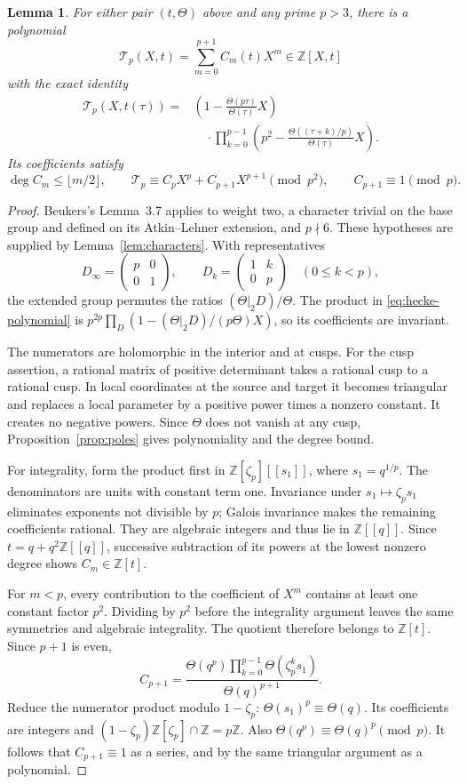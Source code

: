 \documentclass[11pt,a4paper]{article}
\newtheorem{lemma}[theorem]{Lemma}
\theoremstyle{remark}
\newcommand{\Z}{\mathbb Z}
\newcommand{\smat}[4]{\begin{pmatrix}#1&#2\\#3&#4\end{pmatrix}}
\begin{document}
\begin{lemma}\label{lem:hecke}
For either pair $(t,\Theta)$ above and any prime $p>3$, there is a
polynomial
\[
 \mathscr T_p(X,t)=\sum_{m=0}^{p+1}C_m(t)X^m\in\Z[X,t]
\]
with the exact identity
\begin{equation}\label{eq:hecke-polynomial}
\begin{split}
 \mathscr T_p(X,t(\tau))={}&
 \left(1-\frac{\Theta(p\tau)}{\Theta(\tau)}X\right)\\
 &\quad\cdot\prod_{k=0}^{p-1}
 \left(p^2-\frac{\Theta((\tau+k)/p)}{\Theta(\tau)}X\right).
\end{split}
\end{equation}
Its coefficients satisfy
\begin{equation}\label{eq:hecke-properties}
 \deg C_m\le\lfloor m/2\rfloor,\qquad
 \mathscr T_p\equiv C_pX^p+C_{p+1}X^{p+1}\pmod{p^2},
 \qquad C_{p+1}\equiv1\pmod p.
\end{equation}
\end{lemma}
\begin{proof}
Beukers's Lemma~3.7 \cite[pp.~17--18]{beukers} applies to weight two,
a character trivial on the base group and defined on its
Atkin--Lehner extension, and $p\nmid6$. These hypotheses are supplied
by Lemma~\ref{lem:characters}. With representatives
\[
 D_\infty=\smat{p}{0}{0}{1},\qquad
 D_k=\smat{1}{k}{0}{p}\quad(0\le k<p),
\]
the extended group permutes the ratios $(\Theta|_2D)/\Theta$.
The product in \eqref{eq:hecke-polynomial} is
$p^{2p}\prod_D(1-(\Theta|_2D)/(p\Theta)X)$, so its coefficients
are invariant.

The numerators are holomorphic in the interior and at cusps. For the
cusp assertion, a rational matrix of positive determinant takes a
rational cusp to a rational cusp. In local coordinates at the source
and target it becomes triangular and replaces a local parameter by
a positive power times a nonzero constant. It creates no negative
powers. Since $\Theta$ does not vanish at any cusp,
Proposition~\ref{prop:poles} gives polynomiality and the degree bound.

For integrality, form the product first in
$\Z[\zeta_p][[s_1]]$, where $s_1=q^{1/p}$. The denominators are
units with constant term one. Invariance under
$s_1\mapsto\zeta_ps_1$ eliminates exponents not divisible by $p$;
Galois invariance makes the remaining coefficients rational.
They are algebraic integers and thus lie in $\Z[[q]]$. Since
$t=q+q^2\Z[[q]]$, successive subtraction of its powers at the lowest
nonzero degree shows $C_m\in\Z[t]$.

For $m<p$, every contribution to the coefficient of $X^m$ contains
at least one constant factor $p^2$. Dividing by $p^2$ before the
integrality argument leaves the same symmetries and algebraic
integrality. The quotient therefore belongs to $\Z[t]$.
Since $p+1$ is even,
\[
 C_{p+1}=
 \frac{\Theta(q^p)\prod_{k=0}^{p-1}\Theta(\zeta_p^ks_1)}
      {\Theta(q)^{p+1}}.
\]
Reduce the numerator product modulo $1-\zeta_p$:
$\Theta(s_1)^p\equiv\Theta(q)$. Its coefficients are integers and
$(1-\zeta_p)\Z[\zeta_p]\cap\Z=p\Z$. Also
$\Theta(q^p)\equiv\Theta(q)^p\pmod p$. It follows that
$C_{p+1}\equiv1$ as a series, and by the same triangular argument
as a polynomial.
\end{proof}
\end{document}
